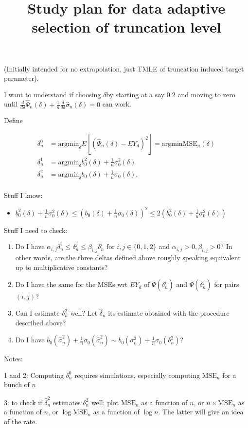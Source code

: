 \documentclass[a4paper]{article}
\title{Study plan for data adaptive selection of truncation level}
\begin{document}
\maketitle


(Initially intended for no extrapolation, just TMLE of truncation induced target parameter).

I want to understand if choosing $\delta$​ by starting at a say 0.2 and moving to zero until $\frac{d}{d\delta} \hat{\Psi}_n(\delta) + \frac{1}{n} \frac{d}{d\delta}\hat{\sigma}_n(\delta) = 0$ can work.

\medskip

Define

\begin{align*}
\delta^0_n &= \text{argmin}_\delta E[(\hat{\Psi}_n(\delta) - EY_d)^2] = \text{argmin} \text{MSE}_n(\delta) \\
\delta^1_n &= \text{argmin}_\delta b_0^2(\delta) + \frac{1}{n} \sigma_0^2(\delta) \\
\delta^2_n &= \text{argmin}_\delta b_0(\delta) + \frac{1}{n} \sigma_0(\delta).\\
\end{align*}

\medskip

Stuff I know:

\begin{itemize}
\item $b_0^2(\delta) + \frac{1}{n} \sigma_0^2(\delta) \leq \left(b_0(\delta) + \frac{1}{n} \sigma_0(\delta)\right)^2 \leq 2 \left(b_0^2(\delta) + \frac{1}{n} \sigma_0^2(\delta) \right)$
\end{itemize}

\medskip

Stuff I need to check:

\begin{enumerate}
\item Do I have $\alpha_{i,j} \delta^i_n \leq \delta^j_n \leq \beta_{i, j} \delta^i_n$ for $i, j \in \{0, 1, 2 \}$ and $\alpha_{i,j} >0, \beta_{i, j} > 0$? In other words, are the three deltas defined above roughly speaking equivalent up to multiplicative constants?
\item Do I have the same for the MSEs wrt $EY_d$ of $\Psi(\delta^i_n)$ and $\Psi(\delta^j_n)$ for pairs $(i,j)$?
\item Can I estimate $\delta^2_n$ well? Let $\hat{\delta}_n$ its estimate obtained with the procedure described above?
\item Do I have $b_0(\hat{\sigma}^2_n) + \frac{1}{n} \sigma_0(\hat{\sigma}^2_n) \sim b_0(\sigma^2_n) + \frac{1}{n} \sigma_0(\delta^2_n)$?
\end{enumerate}

\medskip

Notes:

1 and 2: Computing $\delta^0_n$ requires simulations, especially computing $\text{MSE}_n$ for a bunch of $n$	

3: to check if $\hat{\delta}^2_n$ estimates $\delta^2_n$ well: plot $\text{MSE}_n$ as a function of $n$, or $n \times \text{MSE}_n$ as a function of $n$, or $\log \text{MSE}_n$ as a function of $\log n$. The latter will give an idea of the rate.
\end{document}
